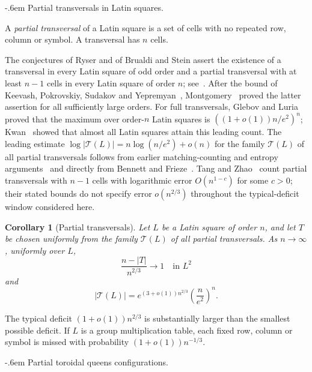\documentclass[11pt,reqno]{amsart}
\makeatletter
\numberwithin{equation}{section}
\renewcommand{\paragraph}{\@startsection{paragraph}{4}%
    \z@{.75\linespacing\@plus.2\linespacing\@minus.1\linespacing}%
    {-.6em}%
    {\normalfont\bfseries}}
\theoremstyle{plain}
\newtheorem{corollary}[theorem]{Corollary}
\theoremstyle{definition}
\newcommand{\calT}{\mathcal{T}}
\makeatother
\begin{document}
\paragraph{Partial transversals in Latin squares.}

A \emph{partial transversal} of a Latin square is a set of cells with no repeated row, column or symbol.
A transversal has $n$ cells.

The conjectures of Ryser and of Brualdi and Stein assert the existence of a transversal in every Latin square of odd order and a partial transversal with at least $n-1$ cells in every Latin square of order $n$; see~\cite{Ryser,Stein}.
After the bound of Keevash, Pokrovskiy, Sudakov and Yepremyan~\cite{KPSY}, Montgomery~\cite{Montgomery} proved the latter assertion for all sufficiently large orders.
For full transversals, Glebov and Luria~\cite{GL} proved that the maximum over order-$n$ Latin squares is $((1+o(1))n/e^2)^n$; Kwan~\cite[Theorem~1.3]{Kwan} showed that almost all Latin squares attain this leading count.
The leading estimate $\log|\calT(L)|=n\log(n/e^2)+o(n)$ for the family $\calT(L)$ of all partial transversals follows from earlier matching-counting and entropy arguments~\cite{GJKKL,Luria} and directly from Bennett and Frieze~\cite[Theorem~4(b)]{BF}.
Tang and Zhao~\cite{TZ} count partial transversals with $n-1$ cells with logarithmic error $O(n^{1-c})$ for some $c>0$; their stated bounds do not specify error $o(n^{2/3})$ throughout the typical-deficit window considered here.

\begin{corollary}[Partial transversals]\label{cor:latin}
    Let $L$ be a Latin square of order $n$, and let $T$ be chosen uniformly from the family $\calT(L)$ of all partial transversals.
    As $n\to\infty$, uniformly over $L$,
    \[
        \frac{n-|T|}{n^{2/3}}\longrightarrow1\quad\text{in }L^2
    \]
    and
    \[
        |\calT(L)| = e^{(3 + o(1))n^{2/3}} \left(\frac{n}{e^2} \right)^n.
    \]
\end{corollary}

The typical deficit $(1+o(1))n^{2/3}$ is substantially larger than the smallest possible deficit.
If $L$ is a group multiplication table, each fixed row, column or symbol is missed with probability $(1+o(1))n^{-1/3}$.

\paragraph{Partial toroidal queens configurations.}
\end{document}
